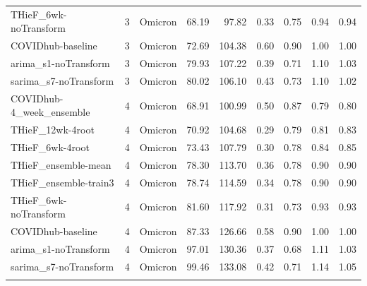 \documentclass[thesis]{umassthesis}  %
\begin{document}
\begin{longtable}{lrlrrrrrr}
  THieF\_6wk-noTransform & 3 & Omicron & 68.19 & 97.82 & 0.33 & 0.75 & 0.94 & 0.94 \\ 
  COVIDhub-baseline & 3 & Omicron & 72.69 & 104.38 & 0.60 & 0.90 & 1.00 & 1.00 \\ 
  arima\_s1-noTransform & 3 & Omicron & 79.93 & 107.22 & 0.39 & 0.71 & 1.10 & 1.03 \\ 
  sarima\_s7-noTransform & 3 & Omicron & 80.02 & 106.10 & 0.43 & 0.73 & 1.10 & 1.02 \\ 
  COVIDhub-4\_week\_ensemble & 4 & Omicron & 68.91 & 100.99 & 0.50 & 0.87 & 0.79 & 0.80 \\ 
  THieF\_12wk-4root & 4 & Omicron & 70.92 & 104.68 & 0.29 & 0.79 & 0.81 & 0.83 \\ 
  THieF\_6wk-4root & 4 & Omicron & 73.43 & 107.79 & 0.30 & 0.78 & 0.84 & 0.85 \\ 
  THieF\_ensemble-mean & 4 & Omicron & 78.30 & 113.70 & 0.36 & 0.78 & 0.90 & 0.90 \\ 
  THieF\_ensemble-train3 & 4 & Omicron & 78.74 & 114.59 & 0.34 & 0.78 & 0.90 & 0.90 \\ 
  THieF\_6wk-noTransform & 4 & Omicron & 81.60 & 117.92 & 0.31 & 0.73 & 0.93 & 0.93 \\ 
  COVIDhub-baseline & 4 & Omicron & 87.33 & 126.66 & 0.58 & 0.90 & 1.00 & 1.00 \\ 
  arima\_s1-noTransform & 4 & Omicron & 97.01 & 130.36 & 0.37 & 0.68 & 1.11 & 1.03 \\ 
  sarima\_s7-noTransform & 4 & Omicron & 99.46 & 133.08 & 0.42 & 0.71 & 1.14 & 1.05 \\ 
   \hline
\hline
\label{tab:table_wave_states}
\end{longtable}
\endgroup

\newpage
\end{document}

